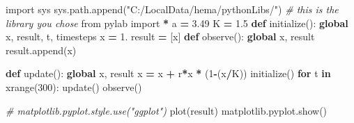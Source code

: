 \documentclass[]{article}
\newenvironment{Shaded}{\begin{snugshade}}{\end{snugshade}}
\newcommand{\KeywordTok}[1]{\textcolor[rgb]{0.13,0.29,0.53}{\textbf{#1}}}
\newcommand{\DecValTok}[1]{\textcolor[rgb]{0.00,0.00,0.81}{#1}}
\newcommand{\FloatTok}[1]{\textcolor[rgb]{0.00,0.00,0.81}{#1}}
\newcommand{\StringTok}[1]{\textcolor[rgb]{0.31,0.60,0.02}{#1}}
\newcommand{\ImportTok}[1]{#1}
\newcommand{\CommentTok}[1]{\textcolor[rgb]{0.56,0.35,0.01}{\textit{#1}}}
\newcommand{\ControlFlowTok}[1]{\textcolor[rgb]{0.13,0.29,0.53}{\textbf{#1}}}
\newcommand{\OperatorTok}[1]{\textcolor[rgb]{0.81,0.36,0.00}{\textbf{#1}}}
\newcommand{\BuiltInTok}[1]{#1}
\newcommand{\NormalTok}[1]{#1}
\begin{document}
\begin{Shaded}
\begin{Highlighting}[]
\ImportTok{import}\NormalTok{ sys}
\NormalTok{sys.path.append(}\StringTok{"C:/LocalData/hema/pythonLibs/"}\NormalTok{) }\CommentTok{# this is the library you chose}
\ImportTok{from}\NormalTok{ pylab }\ImportTok{import} \OperatorTok{*}
\NormalTok{a }\OperatorTok{=} \FloatTok{3.49}
\NormalTok{K }\OperatorTok{=} \FloatTok{1.5}
\KeywordTok{def}\NormalTok{ initialize():}
    \KeywordTok{global}\NormalTok{ x, result, t, timesteps}
\NormalTok{    x }\OperatorTok{=} \DecValTok{1}\NormalTok{.}
\NormalTok{    result }\OperatorTok{=}\NormalTok{ [x]}
\KeywordTok{def}\NormalTok{ observe():}
    \KeywordTok{global}\NormalTok{ x, result}
\NormalTok{    result.append(x)}
    
\KeywordTok{def}\NormalTok{ update():}
    \KeywordTok{global}\NormalTok{ x, result}
\NormalTok{    x }\OperatorTok{=}\NormalTok{ x }\OperatorTok{+}\NormalTok{ r}\OperatorTok{*}\NormalTok{x }\OperatorTok{*}\NormalTok{ (}\DecValTok{1}\OperatorTok{-}\NormalTok{(x}\OperatorTok{/}\NormalTok{K))}
\NormalTok{initialize()}
\ControlFlowTok{for}\NormalTok{ t }\KeywordTok{in} \BuiltInTok{xrange}\NormalTok{(}\DecValTok{300}\NormalTok{):}
\NormalTok{  update()}
\NormalTok{  observe()}
  
\CommentTok{# matplotlib.pyplot.style.use("ggplot")}
\NormalTok{plot(result)}
\NormalTok{matplotlib.pyplot.show()}
\end{Highlighting}
\end{Shaded}
\end{document}
